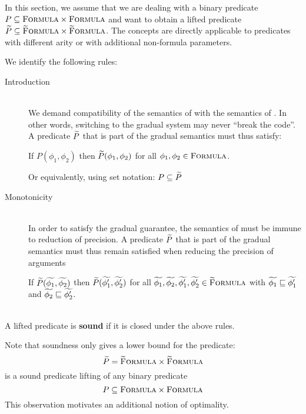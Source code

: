 In this section, we assume that we are dealing with a binary predicate $P \subseteq \textup{\textsc{Formula}} \times \textup{\textsc{Formula}}$ and want to obtain a lifted predicate $\widetilde{P} \subseteq \textup{\textsc{\ensuremath{\widetilde{\text{F}}}ormula}} \times \textup{\textsc{\ensuremath{\widetilde{\text{F}}}ormula}}$.
The concepts are directly applicable to predicates with different arity or with additional non-formula parameters.

We identify the following rules:
\begin{description}
    \item[Introduction]~\\
    We demand compatibility of the semantics of \gvl with the semantics of \svl.
    In other words, switching to the gradual system may never “break the code”.
    A predicate $\widetilde{P}$ that is part of the gradual semantics must thus satisfy:
    
    If $P(\phi_1, \phi_2)$ then $\widetilde{P}(\phi_1, \phi_2)$ for all $\phi_1, \phi_2 \in \textup{\textsc{Formula}}$.
    
    Or equivalently, using set notation: $P \subseteq \widetilde{P}$
    
    \item[Monotonicity]~\\
    In order to satisfy the gradual guarantee, the semantics of \gvl must be immune to reduction of precision.
    A predicate $\widetilde{P}$ that is part of the gradual semantics must thus remain satisfied when reducing the precision of arguments
    
    If $\widetilde{P}(\widetilde{\phi_1}, \widetilde{\phi_2})$ then $\widetilde{P}(\widetilde{\phi_1'}, \widetilde{\phi_2'})$ for all $\widetilde{\phi_1}, \widetilde{\phi_2}, \widetilde{\phi_1'}, \widetilde{\phi_2'} \in \textup{\textsc{\ensuremath{\widetilde{\text{F}}}ormula}}$ with $\widetilde{\phi_1} \sqsubseteq \widetilde{\phi_1'}$ and $\widetilde{\phi_2} \sqsubseteq \widetilde{\phi_2'}$.
\end{description}

\begin{definition}~\\
    A lifted predicate is \textbf{sound} if it is closed under the above rules.
\end{definition}

Note that soundness only gives a lower bound for the predicate:
$$\widetilde{P} = \textup{\textsc{\ensuremath{\widetilde{\text{F}}}ormula}} \times \textup{\textsc{\ensuremath{\widetilde{\text{F}}}ormula}}$$ is a sound predicate lifting of any binary predicate $$P \subseteq \textup{\textsc{Formula}} \times \textup{\textsc{Formula}}$$
This observation motivates an additional notion of optimality.

